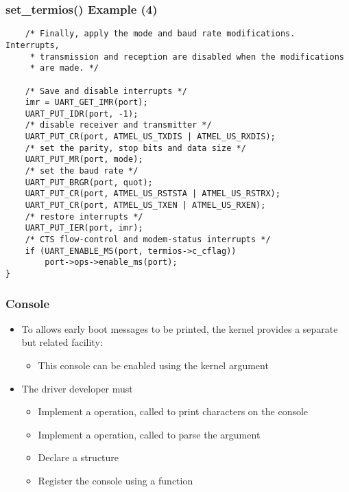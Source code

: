 \begin{frame}[fragile]
  \frametitle{set\_termios() Example (4)}
\begin{verbatim}
    /* Finally, apply the mode and baud rate modifications. Interrupts,
     * transmission and reception are disabled when the modifications
     * are made. */

    /* Save and disable interrupts */
    imr = UART_GET_IMR(port);
    UART_PUT_IDR(port, -1);
    /* disable receiver and transmitter */
    UART_PUT_CR(port, ATMEL_US_TXDIS | ATMEL_US_RXDIS);
    /* set the parity, stop bits and data size */
    UART_PUT_MR(port, mode);
    /* set the baud rate */
    UART_PUT_BRGR(port, quot);
    UART_PUT_CR(port, ATMEL_US_RSTSTA | ATMEL_US_RSTRX);
    UART_PUT_CR(port, ATMEL_US_TXEN | ATMEL_US_RXEN);
    /* restore interrupts */
    UART_PUT_IER(port, imr);
    /* CTS flow-control and modem-status interrupts */
    if (UART_ENABLE_MS(port, termios->c_cflag))
        port->ops->enable_ms(port);
}
  \end{verbatim}
\end{frame}

\begin{frame}
  \frametitle{Console}
  \begin{itemize}
  \item To allows early boot messages to be printed, the kernel
    provides a separate but related facility: 
    \begin{itemize}
    \item This console can be enabled using the  kernel
      argument
    \end{itemize}
  \item The driver developer must
    \begin{itemize}
    \item Implement a  operation, called to
      print characters on the console
    \item Implement a  operation, called to
      parse the  argument
    \item Declare a  structure
    \item Register the console using a 
      function
    \end{itemize}
  \end{itemize}
\end{frame}

